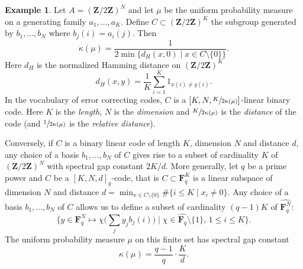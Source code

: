 \documentclass[10pt]{amsart}
\let\ts\textstyle
\theoremstyle{plain}
\theoremstyle{definition}
\newtheorem{example}[theorem]{Example}
\newcommand{\Z}{\mathbf{Z}}
\newcommand{\F}{\mathbf{F}}
\begin{document}
\begin{example}\label{ex:code_spectral_gap} Let $A=(\Z/2\Z)^N$ and let $\mu$ be the uniform probability measure on a generating family $a_1,\dots,a_K$. Define $C\subset (\Z/2\Z)^K$ the subgroup generated by $b_1,\dots,b_N$ where $b_j(i) = a_i(j)$. Then\vspace*{-3pt}
\begin{equation}\label{eq:relation_kappa_distance_binary} \kappa(\mu) = \frac{1}{2 \min\{ d_H(x,0) \mid x \in C\setminus\{0\}\}}.
\end{equation}
Here $d_H$ is the normalized Hamming distance on $(\Z/2\Z)^K$\vspace*{-3pt}
\[
d_H(x,y) = \frac{1}{K}\sum_{i=1}^K 1_{x(i) \neq y(i)}.
\]
In the vocabulary of error correcting codes, $C$ is a $[K,N,\sfrac{K}{2\kappa(\mu)}]$-linear binary code. Here $K$ is the \emph{length}, $N$ is the \emph{dimension} and $\sfrac{K}{2\kappa(\mu)}$ is the \emph{distance} of the code (and $\sfrac 1{2\kappa(\mu)}$ is the \emph{relative distance}).

Conversely, if $C$ is a binary linear code of length $K$, dimension $N$ and distance $d$, any choice of a basis $b_1,\dots,b_N$ of $C$ gives rise to a subset of cardinality $K$ of $(\Z/2\Z)^N$ with spectral gap constant $2K/d$. More generally, let $q$ be a prime power and $C$ be a $[K,N,d]_q$-code, that is $C\subset \F_q^K$ is a linear subspace of dimension $N$ and distance $d = \min_{x \in C\setminus \{0\}} \#\{i\leq K\mid x_i \neq 0\}$. Any choice of a basis $b_1,\dots,b_N$ of $C$ allows us to define a subset of cardinality $(q-1)K$ of $\widehat{\F_q^N}$:\vspace*{-3pt}
\[
\bigl\{ y \in \F_q^N \mapsto \chi\bigl(\ts\sum_j y_j b_j(i)\bigr) \mid \chi \in \widehat{\F_q}\setminus\{1\},\, 1\leq i\leq K\bigr\}.
\]
The uniform probability measure $\mu$ on this finite set has spectral gap constant\vspace*{-3pt}
\begin{equation}\label{eq:relation_kappa_distance_code}
\kappa(\mu) = \frac{q-1}{q}\cdot \frac{K}{d}.
\end{equation}
\end{example}
\end{document}
